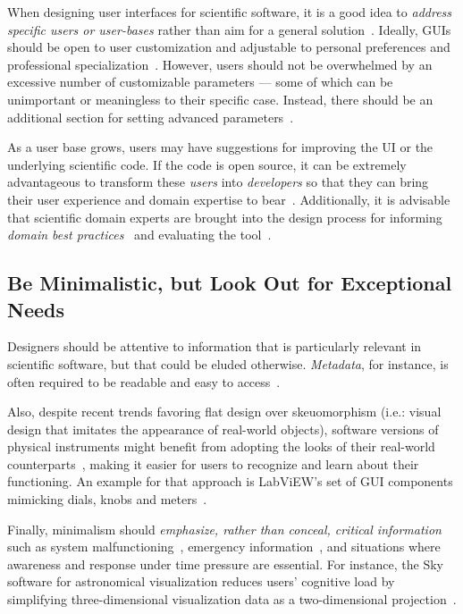 \documentclass[conference]{IEEEtran}
\begin{document}
When designing user interfaces for scientific software, it is a good idea to 
\emph{address specific users or user-bases} rather than aim for a general 
solution~\cite {Javahery:2004, DeRoure:2009}. Ideally, GUIs should be open to 
user customization and adjustable to personal preferences and professional 
specialization~\cite{Gertz:1994, Javahery:2004}. However, users should not be
overwhelmed by an excessive number of customizable parameters --- some 
of which can be unimportant or meaningless to their specific case.
Instead, there should be an additional section for setting advanced 
parameters~\cite{List:2017}. 

As a user base grows, users may have suggestions for improving the UI
or the underlying scientific code. If the code is open source, it can
be extremely advantageous to transform these \textit{users} into
\textit{developers} so that they can bring their user experience and
domain expertise to bear~\cite{Turk:2013:SCH:2484762.2484782}.
Additionally, it is advisable that scientific domain experts are brought into 
the design process for informing \emph{domain best 
practices}~\cite{Schraefel:2004,  DeMatos:2013} and evaluating the 
tool~\cite{Keefe:2010}.

\subsection{Be Minimalistic, but Look Out for Exceptional Needs}

Designers should be attentive to information that is particularly relevant in
scientific software, but that could be eluded otherwise. \emph{Metadata},
for instance, is often required to be readable and easy to
access~\cite{Talbott:2005, Baxter:2006, Macaulay:2009, Keefe:2010, bestprSC, 
Thomer:2016}. 

Also, despite recent trends
favoring flat design over skeuomorphism (i.e.: visual design that imitates the 
appearance of real-world objects), software versions of physical
instruments might benefit from adopting the looks of their real-world
counterparts~\cite{Foster:1998}, making it easier for users to recognize and 
learn about their functioning. An example for that approach is LabViEW's 
set of GUI components mimicking dials, knobs and meters~\cite{LabVIEW}.

Finally, minimalism should \emph{emphasize, rather than
conceal, critical information} such as system malfunctioning~\cite{Morais:2014},
emergency information~\cite{Ferguson:2016}, and situations where awareness and
response under time pressure are essential. For instance, the
Sky software for astronomical visualization reduces users' cognitive load by 
simplifying three-dimensional visualization data as a two-dimensional 
projection~\cite{Aragon:2008}. 
\end{document}
